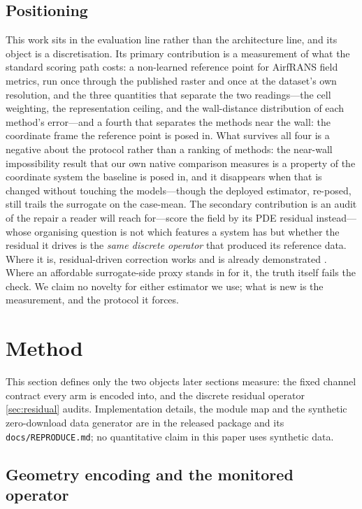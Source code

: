 \subsection{Positioning}

This work sits in the evaluation line rather than the architecture line, and its object is
a discretisation. Its primary contribution is a measurement of what the standard scoring
path costs: a non-learned reference point for AirfRANS field metrics, run once through the
published raster and once at the dataset's own resolution, and the three quantities that
separate the two readings---the cell weighting, the representation ceiling, and the
wall-distance distribution of each method's error---and a fourth that separates the
methods near the wall: the coordinate frame the reference point is posed in. What survives
all four is a negative about the protocol rather than a ranking of methods: the near-wall
impossibility result that our own native comparison measures is a property of the
coordinate system the baseline is posed in, and it disappears when that is changed without
touching the models---though the deployed estimator, re-posed, still trails the surrogate
on the case-mean. The
secondary contribution is an audit of the repair a reader will reach for---score the field
by its PDE residual instead---whose organising question is not which features a system has
but whether the residual it drives is the \emph{same discrete operator} that produced its
reference data. Where it is, residual-driven correction works and is already demonstrated
\citep{lei2026newtonkrylov}. Where an affordable surrogate-side proxy stands in for it, the
truth itself fails the check. We claim no novelty for either estimator we use; what is new
is the measurement, and the protocol it forces.

\section{Method}
\label{sec:method}

This section defines only the two objects later sections measure: the fixed channel
contract every arm is encoded into, and the discrete residual operator
\autoref{sec:residual} audits. Implementation details, the module map and the synthetic
zero-download data generator are in the released package and its
\texttt{docs\slash{}REPRODUCE.md}; no quantitative claim in this paper uses synthetic data.

\subsection{Geometry encoding and the monitored operator}

